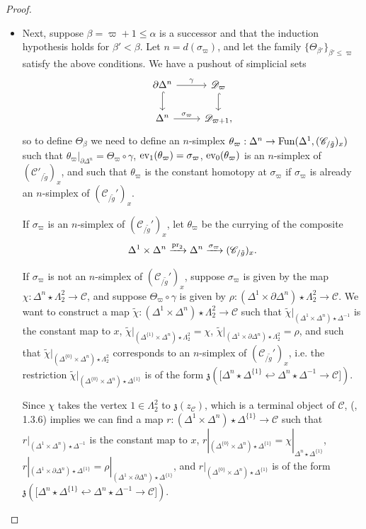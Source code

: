 \documentclass{tac}
\newcommand{\f}[1]{\mathfrak{#1}}
\newcommand{\s}[1]{\mathscr{#1}}
\newcommand{\tx}[1]{\textnormal{#1}}
\begin{document}
\begin{proof}
\begin{itemize}
\item 
Next, suppose $\beta = \varpi +1 \leq \alpha$ is a successor and that the induction hypothesis holds for $\beta' < \beta$.  Let $n=d(\sigma_{\varpi})$, and let the family $\{\Theta_{\beta'} \}_{\beta' \leq \varpi}$ satisfy the above conditions. We have a pushout of simplicial sets
\[\begin{tikzcd}
\partial \Delta^n \arrow[hook]{d} \arrow[]{r}{\gamma} & \s{D}_{\varpi} \arrow[hook]{d} \\
\Delta^n \arrow[]{r}{\sigma_{\varpi}} & \s{D}_{\varpi +1},
\end{tikzcd}\]
so to define $\Theta_{\beta}$ we need to define an $n$-simplex $\theta_{\varpi} : \Delta^n \to \tx{Fun}(\Delta^1 , (\s{C}_{/ \tilde{g}})_x)$ such that $\theta_{\varpi} |_{\partial \Delta^n} = \Theta_\varpi \circ \gamma$, $\tx{ev}_1 (\theta_{\varpi}) = \sigma_\varpi$, $\tx{ev}_0 (\theta_{\varpi})$ is an $n$-simplex of $(\s{C}'_{/ \tilde{g}})_x$, and such that $\theta_{\varpi}$ is the constant homotopy at $\sigma_\varpi$ if $\sigma_\varpi$ is already an $n$-simplex of $(\s{C}_{/\tilde{g}}')_x$.

If $\sigma_\varpi$ is an $n$-simplex of $(\s{C}_{/\tilde{g}}')_x$, let $\theta_{\varpi}$ be the currying of the composite
\[ \Delta^1 \times \Delta^n \xrightarrow{\tx{pr}_2} \Delta^n \xrightarrow{\sigma_\varpi} (\s{C}_{/\tilde{g}})_x . \]

If  $\sigma_\varpi$ is not an $n$-simplex of $(\s{C}_{/\tilde{g}}')_x$, suppose $\sigma_{\varpi}$ is given by the map $\chi : \Delta^n \star \Lambda^2_2 \to \s{C}$, and suppose $\Theta_\varpi \circ \gamma$ is given by $\rho : (\Delta^1 \times \partial \Delta^n) \star \Lambda^2_2 \to \s{C}$.  We want to construct a map $\tilde{\chi} : (\Delta^1 \times \Delta^n) \star \Lambda^2_2 \to \s{C}$ such that $\tilde{\chi}|_ {(\Delta^{1} \times \Delta^n )\star \Delta^{-1}}$ is the constant map to $x$, $\tilde{\chi}|_ {(\Delta^{\{1\}} \times \Delta^n )\star \Lambda^2_2} = \chi$, $\tilde{\chi}|_{(\Delta^{1} \times \partial \Delta^n )\star \Lambda^2_2} = \rho$, and such that $\tilde{\chi}|_ {(\Delta^{\{0\}} \times \Delta^n )\star \Lambda^2_2}$ corresponds to an $n$-simplex of $(\s{C}_{/\tilde{g}}')_x$, i.e. the restriction $\tilde{\chi}|_ {(\Delta^{\{0\}} \times \Delta^n )\star \Delta^{\{1\}}}$ is of the form $\f{z}\left(  \big[ \Delta^n \star \Delta^{\{1\}} \hookleftarrow \Delta^n \star \Delta^{-1} \to \s{C} \big] \right)$.

Since $\chi$ takes the vertex $1 \in \Lambda^2_2$ to $\f{z}(z_\s{C})$, which is a terminal object of $\s{C}$, (\cite{thesis}, 1.3.6) implies we can find a map $r : (\Delta^1 \times \Delta^n) \star \Delta^{\{1 \}} \to \s{C}$ such that $r|_{ (\Delta^1 \times \Delta^n) \star \Delta^{-1} }$ is the constant map to $x$, $r|_{(\Delta^{\{0 \}} \times \Delta^n) \star \Delta^{\{1 \}} } = \chi |_{\Delta^n \star \Delta^{\{1\}}} $, $r|_{ (\Delta^1 \times \partial \Delta^n) \star \Delta^{\{1 \}} } = \rho |_{(\Delta^1 \times \partial \Delta^n) \star \Delta^{\{1 \}}}$,
and $r|_{(\Delta^{\{0 \}} \times \Delta^n) \star \Delta^{\{1 \}} }$ is of the form $\f{z}\left(  \big[ \Delta^n \star \Delta^{\{1\}} \hookleftarrow \Delta^n \star \Delta^{-1} \to \s{C} \big] \right)$.  


\end{itemize}
\end{proof}
\end{document}
